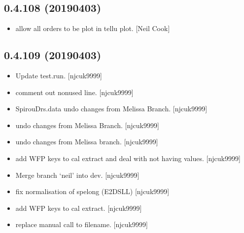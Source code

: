 \documentclass[a4paper,10pt,english]{report}
\begin{document}
\subsection{0.4.108 (2019\sphinxhyphen{}04\sphinxhyphen{}03)}
\label{\detokenize{misc/changelog:id169}}\begin{itemize}
\item {} 
 \sphinxhyphen{} allow all orders to be plot in tellu plot. {[}Neil Cook{]}

\end{itemize}


\subsection{0.4.109 (2019\sphinxhyphen{}04\sphinxhyphen{}03)}
\label{\detokenize{misc/changelog:id170}}\begin{itemize}
\item {} 
Update test.run. {[}njcuk9999{]}

\item {} 
 \sphinxhyphen{} comment out non\sphinxhyphen{}used line. {[}njcuk9999{]}

\item {} 
SpirouDrs.data \sphinxhyphen{} undo changes from Melissa Branch. {[}njcuk9999{]}

\item {} 
 \sphinxhyphen{} undo changes from Melissa Branch. {[}njcuk9999{]}

\item {} 
 \sphinxhyphen{} undo changes from Melissa branch.
{[}njcuk9999{]}

\item {} 
 \sphinxhyphen{} add WFP keys to cal extract and deal with
not having values. {[}njcuk9999{]}

\item {} 
Merge branch ‘neil’ into dev. {[}njcuk9999{]}

\item {} 
 \sphinxhyphen{} fix normalisation of spelong (E2DSLL) {[}njcuk9999{]}

\item {} 
 \sphinxhyphen{} add WFP keys to cal extract. {[}njcuk9999{]}

\item {} 
 \sphinxhyphen{} replace manual call to filename.
{[}njcuk9999{]}

\end{itemize}
\end{document}
